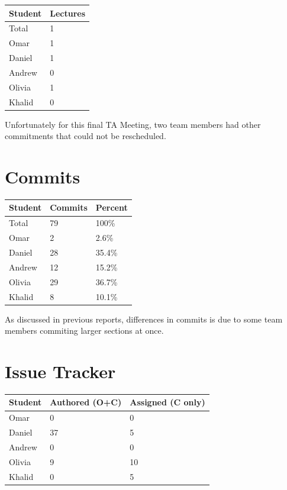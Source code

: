 \documentclass{article}
\begin{document}
\begin{table}[H]
\centering
\begin{tabular}{ll}
\toprule
\textbf{Student} & \textbf{Lectures}\\
\midrule
Total & 1\\
Omar & 1\\
Daniel & 1\\
Andrew & 0\\
Olivia & 1\\
Khalid & 0\\
\bottomrule
\end{tabular}
\end{table}

Unfortunately for this final TA Meeting, two team members had other commitments that could not be rescheduled.

\section{Commits}

\begin{table}[H]
\centering
\begin{tabular}{lll}
\toprule
\textbf{Student} & \textbf{Commits} & \textbf{Percent}\\
\midrule
Total & 79 & 100\% \\
Omar & 2 & 2.6\% \\
Daniel & 28 & 35.4\% \\
Andrew & 12 & 15.2\% \\
Olivia & 29 & 36.7\% \\
Khalid & 8 & 10.1\% \\
\bottomrule
\end{tabular}
\end{table}

As discussed in previous reports, differences in commits is due to some team members commiting larger sections at once.

\section{Issue Tracker}

\begin{table}[H]
\centering
\begin{tabular}{lll}
\toprule
\textbf{Student} & \textbf{Authored (O+C)} & \textbf{Assigned (C only)}\\
\midrule
Omar & 0 & 0 \\
Daniel & 37 & 5 \\
Andrew & 0 & 0 \\
Olivia & 9 & 10 \\
Khalid & 0 & 5 \\
\bottomrule
\end{tabular}
\end{table}
\end{document}
